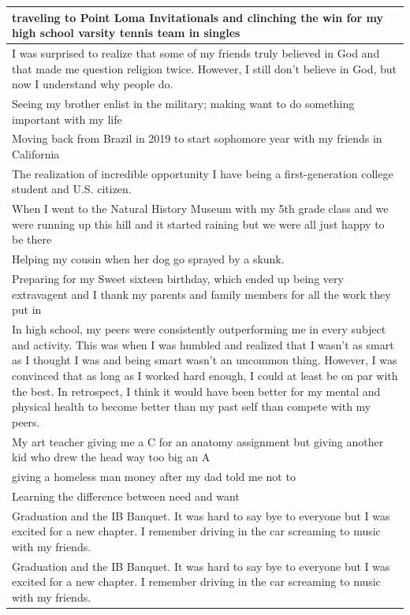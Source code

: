 \documentclass[
  .7em,
  letterpaper,
  DIV=11,
  numbers=noendperiod]{scrartcl}
\begin{document}
\begin{table}
\begin{tabular}{l}
\hline
traveling to Point Loma Invitationals and clinching the win for my high school varsity tennis team in singles\\
\hline
I was surprised to realize that some of my friends truly believed in God and that made me question religion twice. However, I still don't believe in God, but now I understand why people do.\\
\hline
Seeing my brother enlist in the military; making want to do something important with my life\\
\hline
Moving back from Brazil in 2019 to start sophomore year with my friends in California\\
\hline
The realization of incredible opportunity I have being a first-generation college student and U.S. citizen.\\
\hline
When I went to the Natural History Museum with my 5th grade class and we were running up this hill and it started raining but we were all just happy to be there\\
\hline
Helping my cousin when her dog go sprayed by a skunk.\\
\hline
Preparing for my Sweet sixteen birthday, which ended up being very extravagent and I thank my parents and family members for all the work they put in\\
\hline
In high school, my peers were consistently outperforming me in every subject and activity. This was when I was humbled and realized that I wasn’t as smart as I thought I was and being smart wasn’t an uncommon thing. However, I was convinced that as long as I worked hard enough, I could at least be on par with the best. In retrospect, I think it would have been better for my mental and physical health to become better than my past self than compete with my peers.\\
\hline
My art teacher giving me a C for an anatomy assignment but giving another kid who drew the head way too big an A\\
\hline
giving a homeless man money after my dad told me not to\\
\hline
Learning the difference between need and want\\
\hline
Graduation and the IB Banquet. It was hard to say bye to everyone but I was excited for a new chapter. I remember driving in the car screaming to music with my friends.\\
\hline
Graduation and the IB Banquet. It was hard to say bye to everyone but I was excited for a new chapter. I remember driving in the car screaming to music with my friends.\\

\end{tabular}
\end{table}
\end{document}
